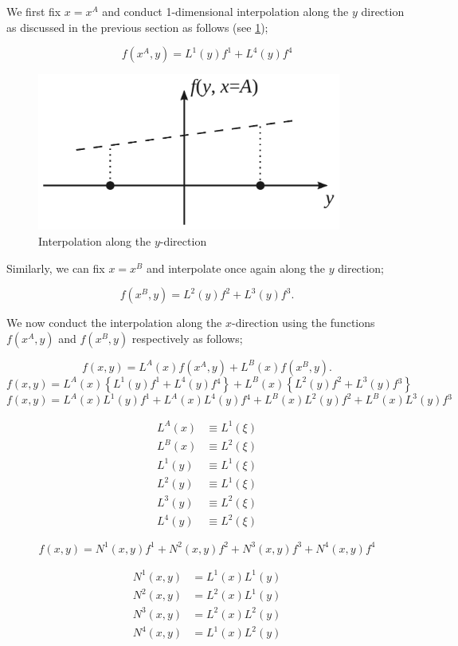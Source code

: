 We first fix $x = {x^A}$ and conduct 1-dimensional interpolation along the $y$ direction as discussed in the previous section as follows (see \cref{fig:onedimn});

\[f({x^A},y) = {L^1}(y){f^1} + {L^4}(y){f^4}\]

\begin{figure}[H]
\centering
\includegraphics[width=10cm]{inter1D.pdf}
\caption{Interpolation along the $y$-direction}
\label{fig:onedimn}
\end{figure}

Similarly, we can fix $x = {x^B}$ and interpolate once again along the $y$ direction;

\[f({x^B},y) = {L^2}(y){f^2} + {L^3}(y){f^3}.\]

We now conduct the interpolation along the $x$-direction using the functions $f({x^A},y)$ and $f({x^B},y)$ respectively as follows;

\[f(x,y) = {L^A}(x){f({x^A},y)} + {L^B}(x){f({x^B},y)}.\]
\[f(x,y) = {L^A}(x)\left\{ {{L^1}(y){f^1} + {L^4}(y)f{}^4} \right\} + {L^B}(x)\left\{ {{L^2}(y){f^2} + {L^3}(y)f{}^3} \right\}\]
\[f(x,y) = {L^A}(x){L^1}(y){f^1} + {L^A}(x){L^4}(y)f{}^4 + {L^B}(x){L^2}(y){f^2} + {L^B}(x){L^3}(y)f{}^3\]


\begin{align*}
{L^A}(x) & \equiv {L^1}(\xi ) \\
{L^B}(x) & \equiv {L^2}(\xi ) \\
{L^1}(y) & \equiv {L^1}(\xi ) \\
{L^2}(y) & \equiv {L^1}(\xi ) \\
{L^3}(y) & \equiv {L^2}(\xi ) \\
{L^4}(y) & \equiv {L^2}(\xi )
\end{align*}

\[f(x,y) = {N^1}(x,y){f^1} + {N^2}(x,y){f^2} + {N^3}(x,y){f^3} + {N^4}(x,y){f^4}\]

\begin{align*}
{N^1}(x,y) & = {L^1}(x){L^1}(y) \\
{N^2}(x,y) & = {L^2}(x){L^1}(y) \\
{N^3}(x,y) & = {L^2}(x){L^2}(y) \\
{N^4}(x,y) & = {L^1}(x){L^2}(y)
\end{align*}

